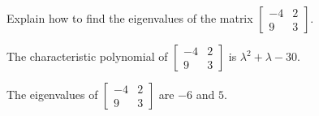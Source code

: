 
\begin{exerciseStatement}


Explain how to find the eigenvalues of the matrix \( \left[\begin{array}{cc}
-4 & 2 \\
9 & 3
\end{array}\right] \).


\end{exerciseStatement}
    
\begin{exerciseAnswer} 


The characteristic polynomial of \( \left[\begin{array}{cc}
-4 & 2 \\
9 & 3
\end{array}\right] \) is \( \lambda^{2} + \lambda - 30 \).



The eigenvalues of \( \left[\begin{array}{cc}
-4 & 2 \\
9 & 3
\end{array}\right] \) are \( -6 \) and \( 5 \).


\end{exerciseAnswer}
    
